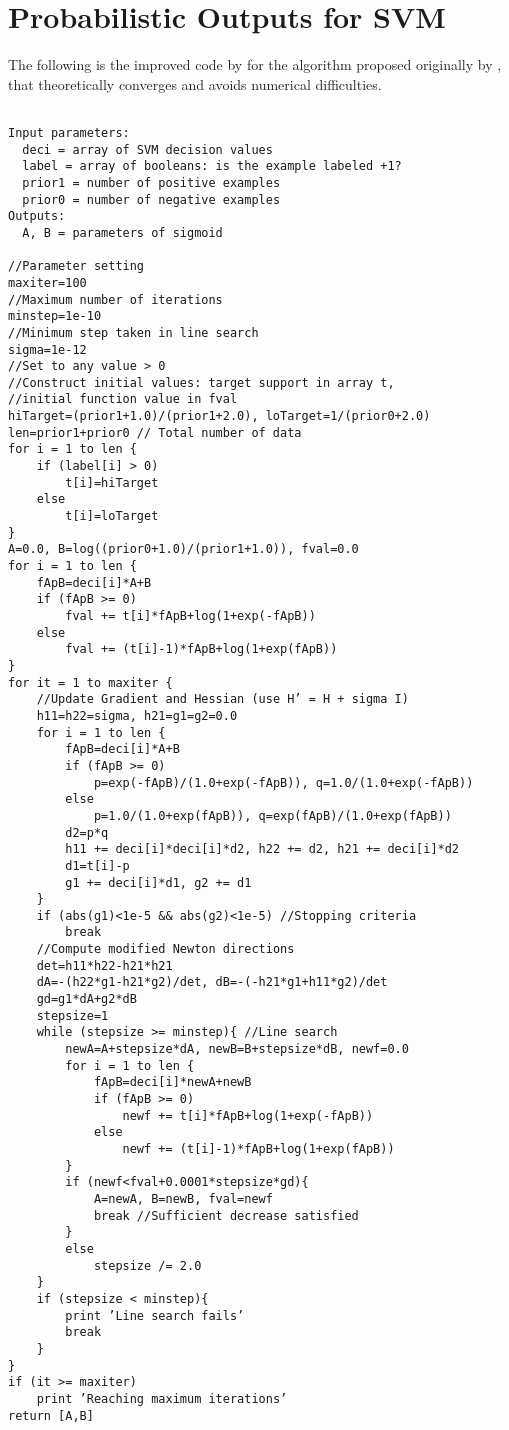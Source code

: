 \chapter{Probabilistic Outputs for SVM}
\label{appendix:SVMProb}
The following is the improved code by \citep{Lin03Note} for the algorithm proposed originally by \citep{Platt99}, that theoretically converges and avoids numerical difficulties.

\begin{verbatim}

Input parameters:
  deci = array of SVM decision values
  label = array of booleans: is the example labeled +1?
  prior1 = number of positive examples
  prior0 = number of negative examples
Outputs:
  A, B = parameters of sigmoid
  
//Parameter setting
maxiter=100
//Maximum number of iterations
minstep=1e-10
//Minimum step taken in line search
sigma=1e-12
//Set to any value > 0
//Construct initial values: target support in array t,
//initial function value in fval
hiTarget=(prior1+1.0)/(prior1+2.0), loTarget=1/(prior0+2.0)
len=prior1+prior0 // Total number of data
for i = 1 to len {
    if (label[i] > 0)
        t[i]=hiTarget
    else
        t[i]=loTarget
}
A=0.0, B=log((prior0+1.0)/(prior1+1.0)), fval=0.0
for i = 1 to len {
    fApB=deci[i]*A+B
    if (fApB >= 0)
        fval += t[i]*fApB+log(1+exp(-fApB))
    else
        fval += (t[i]-1)*fApB+log(1+exp(fApB))
}
for it = 1 to maxiter {
    //Update Gradient and Hessian (use H’ = H + sigma I)
    h11=h22=sigma, h21=g1=g2=0.0
    for i = 1 to len {
        fApB=deci[i]*A+B
        if (fApB >= 0)
            p=exp(-fApB)/(1.0+exp(-fApB)), q=1.0/(1.0+exp(-fApB))
        else
            p=1.0/(1.0+exp(fApB)), q=exp(fApB)/(1.0+exp(fApB))
        d2=p*q
        h11 += deci[i]*deci[i]*d2, h22 += d2, h21 += deci[i]*d2
        d1=t[i]-p
        g1 += deci[i]*d1, g2 += d1
    }
    if (abs(g1)<1e-5 && abs(g2)<1e-5) //Stopping criteria
        break
    //Compute modified Newton directions
    det=h11*h22-h21*h21
    dA=-(h22*g1-h21*g2)/det, dB=-(-h21*g1+h11*g2)/det
    gd=g1*dA+g2*dB
    stepsize=1
    while (stepsize >= minstep){ //Line search
        newA=A+stepsize*dA, newB=B+stepsize*dB, newf=0.0
        for i = 1 to len {
            fApB=deci[i]*newA+newB
            if (fApB >= 0)
                newf += t[i]*fApB+log(1+exp(-fApB))
            else
                newf += (t[i]-1)*fApB+log(1+exp(fApB))
        }
        if (newf<fval+0.0001*stepsize*gd){
            A=newA, B=newB, fval=newf
            break //Sufficient decrease satisfied
        }
        else
            stepsize /= 2.0
    }
    if (stepsize < minstep){
        print ’Line search fails’
        break
    }
}
if (it >= maxiter)
    print ’Reaching maximum iterations’
return [A,B]
\end{verbatim}
